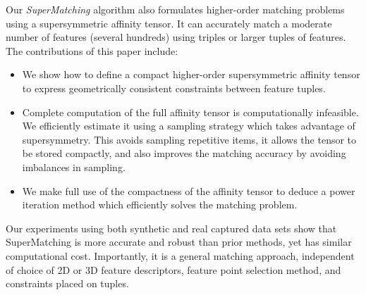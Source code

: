 Our \emph{SuperMatching} algorithm also formulates higher-order matching problems using a supersymmetric affinity tensor. It can accurately match a moderate number
of features (several hundreds) using triples or larger tuples of features.
The contributions of this paper include:
\begin{itemize}
\item We show how to define a compact higher-order supersymmetric affinity tensor to express geometrically consistent constraints between feature tuples.

\item Complete computation of the full affinity tensor is computationally infeasible. We efficiently estimate it using a sampling strategy which takes advantage of supersymmetry. This avoids sampling repetitive items, it allows the tensor to be stored compactly, and also improves the matching accuracy by avoiding imbalances in sampling.

\item We make full use of the compactness of the affinity tensor to deduce a power iteration method which efficiently solves the matching problem.
\end{itemize}

Our experiments using both synthetic and real captured data sets show that SuperMatching is more accurate and robust than prior methods,
yet has similar computational cost.
Importantly, it is a general matching approach, independent of choice of 2D or 3D feature descriptors, feature point selection method, and constraints placed on tuples.
